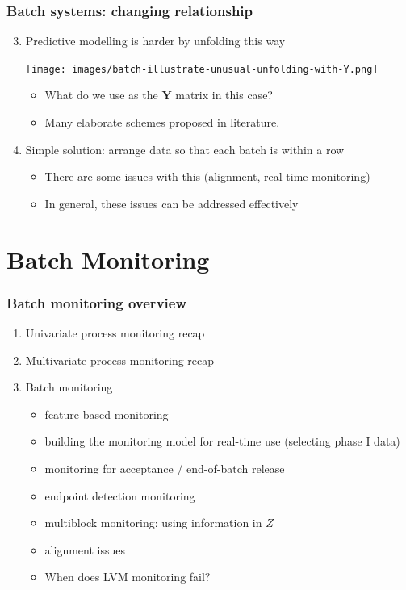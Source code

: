 \documentclass[handout, 12pt]{beamer}
\begin{document}
\begin{frame}\frametitle{Batch systems: changing relationship}
\begin{enumerate}
	\setcounter{enumi}{2}
	\item 	Predictive modelling is harder by unfolding this way

			\begin{center}
				\texttt{[image: images/batch-illustrate-unusual-unfolding-with-Y.png]}
			\end{center}
			
		
			\begin{itemize}
				\item 	What do we use as the \( \mathbf{Y} \) matrix in this case?
				\item 	Many elaborate schemes proposed in literature.			
			\end{itemize}
		
	\item 	Simple solution: arrange data so that each batch is within a row
	
			\begin{itemize}
				\item 	There are some issues with this  (alignment, real-time monitoring)
				\item 	In general, these issues can be addressed effectively
			\end{itemize}
\end{enumerate}
\end{frame}

\section{Batch Monitoring}

\begin{frame}\frametitle{Batch monitoring overview}

\begin{enumerate}
	\item 	Univariate process monitoring recap
	
	\item	Multivariate process monitoring recap
	
	\item	Batch monitoring
	
		\begin{itemize}
			\item	feature-based monitoring			
			\item	building the monitoring model for real-time use (selecting phase I data)
			\item	monitoring for acceptance / end-of-batch release
			\item	endpoint detection monitoring
			\item	multiblock monitoring: using information in \( Z \)			
			\item	alignment issues
			\item 	When does LVM monitoring fail?
		\end{itemize}
\end{enumerate}
\end{frame}
\end{document}
